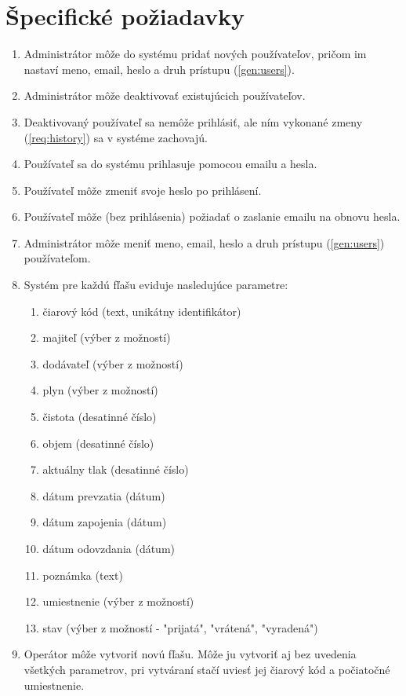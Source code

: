 \documentclass{zah}
\begin{document}
\cleardoublepage
\section{Špecifické požiadavky}
\label{reqs}

\begin{enumerate}
\item Administrátor môže do systému pridať nových používateľov, pričom im nastaví meno, email, heslo a druh prístupu (\ref{gen:users}).
\item Administrátor môže deaktivovať existujúcich používateľov.
\item Deaktivovaný používateľ sa nemôže prihlásiť, ale ním vykonané zmeny (\ref{req:history}) sa v systéme zachovajú.
\item Používateľ sa do systému prihlasuje pomocou emailu a hesla.
\item Používateľ môže zmeniť svoje heslo po prihlásení.
\item Používateľ môže (bez prihlásenia) požiadať o zaslanie emailu na obnovu hesla.
\item Administrátor môže meniť meno, email, heslo a druh prístupu (\ref{gen:users}) používateľom.
\item Systém pre každú fľašu eviduje nasledujúce parametre: 
\begin{enumerate}
	\tightlist
	\item čiarový kód (text, unikátny identifikátor)
	\item \label{req:param:owner} majiteľ (výber z možností)
	\item \label{req:param:provider} dodávateľ (výber z možností)
	\item \label{req:param:gas} plyn (výber z možností)
	\item čistota (desatinné číslo)
	\item objem (desatinné číslo)
	\item \label{req:param:pressure} aktuálny tlak (desatinné číslo)
	\item dátum prevzatia (dátum)
	\item dátum zapojenia (dátum)
	\item dátum odovzdania (dátum)
	\item poznámka (text)
	\item \label{req:param:location} umiestnenie (výber z možností)
	\item stav (výber z možností - "prijatá", "vrátená", "vyradená")
\end{enumerate}
\item Operátor môže vytvoriť novú fľašu. Môže ju vytvoriť aj bez uvedenia všetkých parametrov, pri vytváraní stačí uviesť jej čiarový kód a počiatočné umiestnenie.

\end{enumerate}
\end{document}
